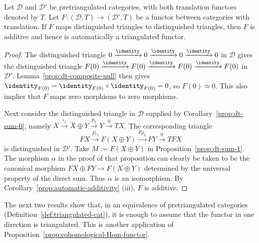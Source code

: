 \begin{corollary}\label{prop:triangulated-automatic-additivity}
	Let $\mathcal{D}$ and $\mathcal{D}'$ be pretriangulated categories, with
	both translation functors denoted by $T$. Let
	$F: (\mathcal{D}, T) \to (\mathcal{D}', T)$ be a functor between
	categories with translation. If $F$ maps distinguished triangles to
	distinguished triangles, then $F$ is additive and hence is automatically
	a triangulated functor.
\end{corollary}

\begin{proof}
	The distinguished triangle
	$0 \xrightarrow{\identity} 0 \xrightarrow{\identity} 0
	\xrightarrow{\identity} 0$ in $\mathcal{D}$ gives the distinguished
	triangle
	$F(0) \xrightarrow{\identity} F(0) \xrightarrow{\identity} F(0)
	\xrightarrow{\identity} F(0)$ in $\mathcal{D}'$.
	Lemma~\ref{prop:dt-composite-null} then gives
	$\identity_{F(0)} = \identity_{F(0)} \circ \identity_{F(0)} = 0$, so
	$F(0) \simeq 0$. This also implies that $F$ maps zero morphisms to zero
	morphisms.

	Next consider the distinguished triangle in $\mathcal{D}$ supplied by
	Corollary~\ref{prop:dt-sum-0}, namely
	$X \xrightarrow{\iota_1} X \oplus Y \xrightarrow{p_2} Y
	\xrightarrow{0} TX$. The corresponding triangle
	\[ FX \xrightarrow{F\iota_1} F(X \oplus Y) \xrightarrow{Fp_2} FY \xrightarrow{0} TFX \]
	is distinguished in $\mathcal{D}'$. Take $M := F(X \oplus Y)$ in
	Proposition~\ref{prop:dt-sum-1}. The morphism $\alpha$ in the proof of
	that proposition can clearly be taken to be the canonical morphism
	$FX \oplus FY \to F(X \oplus Y)$ determined by the universal property of
	the direct sum. Thus $\alpha$ is an isomorphism. By
	Corollary~\ref{prop:automatic-additivity} (iii), $F$ is additive.
\end{proof}

The next two results show that, in an equivalence of pretriangulated
categories (Definition~\ref{def:triangulated-cat}), it is enough to assume
that the functor in one direction is triangulated. This is another
application of Proposition~\ref{prop:cohomological-Hom-functor}.

